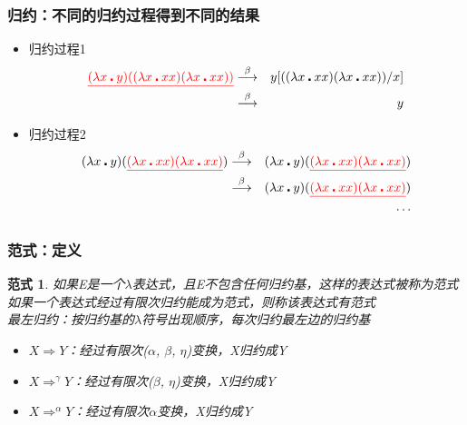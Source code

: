 \documentclass[CJK,compress,hyperref]{beamer}
\begin{document}
\begin{CJK}{UTF8}{song}
\begin{frame}
  \frametitle{归约：不同的归约过程得到不同的结果} 
  \label{ambig}
  \begin{itemize}
  \item 归约过程1 
    \begin{eqnarray*}
      {\color{red}\underline{(\lambda x \centerdot y) ((\lambda x \centerdot xx) (\lambda x \centerdot xx))}}  &  \stackrel{\beta}{\longrightarrow} & y[((\lambda x \centerdot xx) (\lambda x \centerdot xx))/x] \\
                                                                                                               &   \stackrel{\beta}{\longrightarrow} & y 
    \end{eqnarray*} 
  \item 归约过程2 
    \begin{eqnarray*}
      (\lambda x \centerdot y) ({\color{red}\underline{(\lambda x \centerdot xx) (\lambda x \centerdot xx)}}) &  \stackrel{\beta}{\longrightarrow} & (\lambda x \centerdot y) ({\color{red}\underline{(\lambda x \centerdot xx) (\lambda x \centerdot xx)}})  \\ 
                                                                                                              &  \stackrel{\beta}{\longrightarrow} & (\lambda x \centerdot y) ({\color{red}\underline{(\lambda x \centerdot xx) (\lambda x \centerdot xx)}}) \\  
                                                                                                              & & \cdots
    \end{eqnarray*} 
  \end{itemize}  
\end{frame}

\begin{frame}
  \frametitle{范式：定义} 
  \newtheorem{Paradigm}{范式} 
  \begin{Paradigm}
    如果E是一个$\lambda$表达式，且E不包含任何归约基，这样的表达式被称为{\color{red}范式} \\ 
    如果一个表达式经过有限次归约能成为范式，则称该表达式有范式 \\ 
    最左归约：按归约基的$\lambda$符号出现顺序，每次归约最左边的归约基 
    \begin{itemize}
    \item $X \Rightarrow Y$：经过有限次($\alpha$, $\beta$, $\eta$)变换，X归约成Y
    \item $X \Rightarrow^\gamma Y$：经过有限次($\beta$, $\eta$)变换，X归约成Y
    \item $X \Rightarrow^\alpha Y$：经过有限次$\alpha$变换，X归约成Y
    \end{itemize}
  \end{Paradigm} 
\end{frame} 


\end{CJK}
\end{document}
